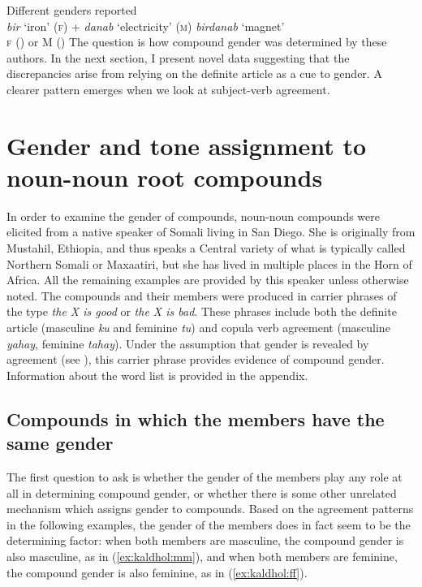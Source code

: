 \documentclass[output=paper]{langscibook}
\begin{document}
\ea\label{ex:kaldhol:birdanab}
	Different genders reported\\
	\textit{bir} `iron' (\textsc{f}) + \textit{danab} `electricity' (\textsc{m}) \pil \textit{birdanab} `magnet'\\
	\textsc{f} (\citealt[158]{Saeed1999a}) or M (\citealt[41]{Zorc1993})
\z
The question is how compound gender was determined by these authors. In the next section, I present novel data suggesting that the discrepancies arise from relying on the definite article as a cue to gender. A clearer pattern emerges when we look at subject-verb agreement.

\section{Gender and tone assignment to noun-noun root compounds}\label{sec:kaldhol:results}
In order to examine the gender of compounds, noun-noun compounds were elicited from a native speaker of Somali living in San Diego. She is originally from Mustahil, Ethiopia, and thus speaks a Central variety of what is typically called Northern Somali or Maxaatiri, but she has lived in multiple places in the Horn of Africa. All the remaining examples are provided by this speaker unless otherwise noted. The compounds and their members were produced in carrier phrases of the type \textit{the X is good} or \textit{the X is bad}. These phrases include both the definite article (masculine \textit{ku} and feminine \textit{tu}) and copula verb agreement (masculine \textit{yahay}, feminine \textit{tahay}). Under the assumption that gender is revealed by agreement (see ), this carrier phrase provides evidence of compound gender. Information about the word list is provided in the appendix.

\subsection{Compounds in which the members have the same gender}\label{sec:kaldhol:samegender}
The first question to ask is whether the gender of the members play any role at all in determining compound gender, or whether there is some other unrelated mechanism which assigns gender to compounds. Based on the agreement patterns in the following examples, the gender of the members does in fact seem to be the determining factor: when both members are masculine, the compound gender is also masculine, as in (\ref{ex:kaldhol:mm}), and when both members are feminine, the compound gender is also feminine, as in (\ref{ex:kaldhol:ff}).
\end{document}
